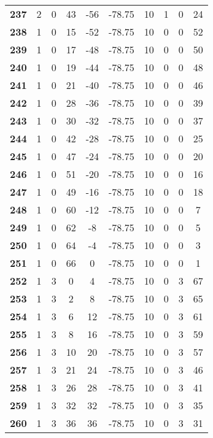 \documentclass{article}%
\begin{document}
\begin{longtable}{cccccccccc}
        \textbf{237} & 2 & 0 & 43 & -56 & -78.75 & 10 & 1 & 0 & 24 \\ 
        \textbf{238} & 1 & 0 & 15 & -52 & -78.75 & 10 & 0 & 0 & 52 \\ 
        \textbf{239} & 1 & 0 & 17 & -48 & -78.75 & 10 & 0 & 0 & 50 \\ 
        \textbf{240} & 1 & 0 & 19 & -44 & -78.75 & 10 & 0 & 0 & 48 \\ 
        \textbf{241} & 1 & 0 & 21 & -40 & -78.75 & 10 & 0 & 0 & 46 \\ 
        \textbf{242} & 1 & 0 & 28 & -36 & -78.75 & 10 & 0 & 0 & 39 \\ 
        \textbf{243} & 1 & 0 & 30 & -32 & -78.75 & 10 & 0 & 0 & 37 \\ 
        \textbf{244} & 1 & 0 & 42 & -28 & -78.75 & 10 & 0 & 0 & 25 \\ 
        \textbf{245} & 1 & 0 & 47 & -24 & -78.75 & 10 & 0 & 0 & 20 \\ 
        \textbf{246} & 1 & 0 & 51 & -20 & -78.75 & 10 & 0 & 0 & 16 \\ 
        \textbf{247} & 1 & 0 & 49 & -16 & -78.75 & 10 & 0 & 0 & 18 \\ 
        \textbf{248} & 1 & 0 & 60 & -12 & -78.75 & 10 & 0 & 0 & 7 \\ 
        \textbf{249} & 1 & 0 & 62 & -8 & -78.75 & 10 & 0 & 0 & 5 \\ 
        \textbf{250} & 1 & 0 & 64 & -4 & -78.75 & 10 & 0 & 0 & 3 \\ 
        \textbf{251} & 1 & 0 & 66 & 0 & -78.75 & 10 & 0 & 0 & 1 \\ 
        \textbf{252} & 1 & 3 & 0 & 4 & -78.75 & 10 & 0 & 3 & 67 \\ 
        \textbf{253} & 1 & 3 & 2 & 8 & -78.75 & 10 & 0 & 3 & 65 \\ 
        \textbf{254} & 1 & 3 & 6 & 12 & -78.75 & 10 & 0 & 3 & 61 \\ 
        \textbf{255} & 1 & 3 & 8 & 16 & -78.75 & 10 & 0 & 3 & 59 \\ 
        \textbf{256} & 1 & 3 & 10 & 20 & -78.75 & 10 & 0 & 3 & 57 \\ 
        \textbf{257} & 1 & 3 & 21 & 24 & -78.75 & 10 & 0 & 3 & 46 \\ 
        \textbf{258} & 1 & 3 & 26 & 28 & -78.75 & 10 & 0 & 3 & 41 \\ 
        \textbf{259} & 1 & 3 & 32 & 32 & -78.75 & 10 & 0 & 3 & 35 \\ 
        \textbf{260} & 1 & 3 & 36 & 36 & -78.75 & 10 & 0 & 3 & 31 \\ 

\end{longtable}
\end{document}
